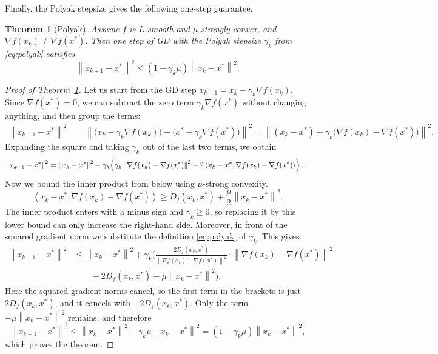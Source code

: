\documentclass[11pt]{article}
\newtheorem{theorem}{Theorem}
\newcommand{\norm}[1]{\left\| #1 \right\|}
\newcommand{\inner}[2]{\left\langle #1, #2 \right\rangle}
\begin{document}
Finally, the Polyak stepsize gives the following one-step guarantee.

\begin{theorem}[Polyak]\label{thm:polyak}
Assume $f$ is $L$-smooth and $\mu$-strongly convex, and $\nabla f(x_k) \neq \nabla f(x^*)$.
Then one step of GD with the Polyak stepsize $\gamma_k$ from \eqref{eq:polyak} satisfies
\[
\norm{x_{k+1}-x^*}^2 \leq (1-\gamma_k\mu)\norm{x_k-x^*}^2.
\]
\end{theorem}

\begin{proof}[Proof of Theorem~\ref{thm:polyak}]
Let us start from the GD step $x_{k+1} = x_k - \gamma_k\nabla f(x_k)$.
Since $\nabla f(x^*) = 0$, we can subtract the zero term $\gamma_k\nabla f(x^*)$
without changing anything, and then group the terms:
\begin{align*}
\norm{x_{k+1}-x^*}^2
&= \norm{\bigl(x_k - \gamma_k\nabla f(x_k)\bigr)-\bigl(x^* - \gamma_k\nabla f(x^*)\bigr)}^2
 = \norm{(x_k - x^*) - \gamma_k\bigl(\nabla f(x_k) -\nabla f(x^*)\bigr)}^2.
\end{align*}
Expanding the square and taking $\gamma_k$ out of the last two terms, we obtain
\begin{align*}
\norm{x_{k+1}-x^*}^2
&= \norm{x_k - x^*}^2 + \gamma_k\Bigl(\gamma_k\norm{\nabla f(x_k) -\nabla f(x^*)}^2
   - 2\inner{x_k - x^*}{\nabla f(x_k) -\nabla f(x^*)}\Bigr).
\end{align*}
Now we bound the inner product from below using $\mu$-strong convexity.
\[
\inner{x_k - x^*}{\nabla f(x_k) -\nabla f(x^*)} \geq D_f(x_k,x^*) + \frac{\mu}{2}\norm{x_k - x^*}^2.
\]
The inner product enters with a minus sign and $\gamma_k \geq 0$, so replacing it by this
lower bound can only increase the right-hand side. Moreover, in front of the squared gradient
norm we substitute the definition \eqref{eq:polyak} of $\gamma_k$. This gives
\begin{align*}
\norm{x_{k+1}-x^*}^2
&\leq \norm{x_k - x^*}^2 + \gamma_k\Biggl(\frac{2D_f(x_k,x^*)}{\norm{\nabla f(x_k) -\nabla f(x^*)}^2}
   \cdot\norm{\nabla f(x_k) -\nabla f(x^*)}^2 \\
&\qquad - 2D_f(x_k,x^*) - \mu\norm{x_k - x^*}^2\Biggr).
\end{align*}
Here the squared gradient norms cancel, so the first term in the brackets is just
$2D_f(x_k,x^*)$, and it cancels with $-2D_f(x_k,x^*)$. Only the term
$-\mu\norm{x_k - x^*}^2$ remains, and therefore
\[
\norm{x_{k+1}-x^*}^2 \leq \norm{x_k - x^*}^2 - \gamma_k\mu\norm{x_k - x^*}^2
= (1-\gamma_k\mu)\norm{x_k - x^*}^2,
\]
which proves the theorem.
\end{proof}
\end{document}
